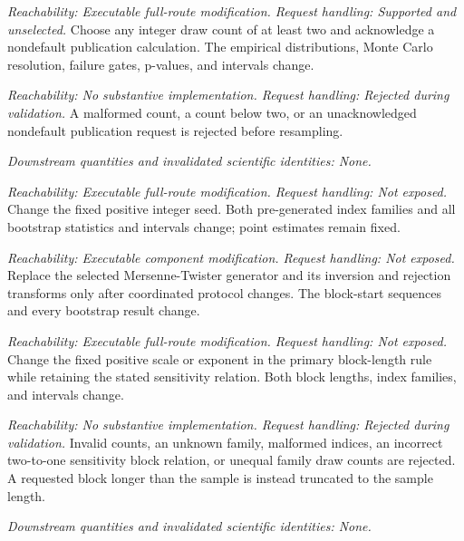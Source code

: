 \documentclass[11pt]{article}
\begin{document}
\begin{description}[style=nextline]
\item[Bootstrap draw count.]
\emph{Reachability: Executable full-route modification. Request handling: Supported and unselected.}
Choose any integer draw count of at least two and acknowledge a nondefault publication calculation.
The empirical distributions, Monte Carlo resolution, failure gates, p-values, and intervals change.

\item[Invalid bootstrap draw request.]
\emph{Reachability: No substantive implementation. Request handling: Rejected during validation.}
A malformed count, a count below two, or an unacknowledged nondefault publication request is rejected
before resampling.

\emph{Downstream quantities and invalidated scientific identities: None.}

\item[Bootstrap seed.]
\emph{Reachability: Executable full-route modification. Request handling: Not exposed.}
Change the fixed positive integer seed. Both pre-generated index families and all bootstrap
statistics and intervals change; point estimates remain fixed.

\item[Pseudo-random-number generator.]
\emph{Reachability: Executable component modification. Request handling: Not exposed.}
Replace the selected Mersenne-Twister generator and its inversion and rejection transforms only
after coordinated protocol changes. The block-start sequences and every bootstrap result change.

\item[Bootstrap block-length rule.]
\emph{Reachability: Executable full-route modification. Request handling: Not exposed.}
Change the fixed positive scale or exponent in the primary block-length rule while retaining the
stated sensitivity relation. Both block lengths, index families, and intervals change.

\item[Invalid resampling dimensions or family.]
\emph{Reachability: No substantive implementation. Request handling: Rejected during validation.}
Invalid counts, an unknown family, malformed indices, an incorrect two-to-one sensitivity block
relation, or unequal family draw counts are rejected. A requested block longer than the sample is
instead truncated to the sample length.

\emph{Downstream quantities and invalidated scientific identities: None.}


\end{description}
\end{document}
